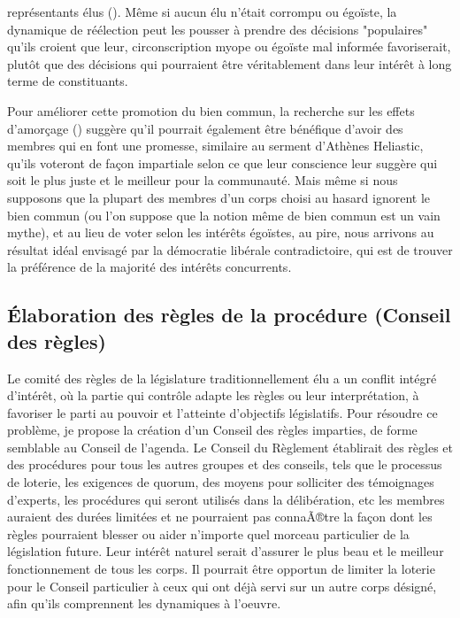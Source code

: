 représentants élus (\cite{fishkin09:_when_peopl_speak}). Même si aucun élu n'était corrompu
ou égoïste, la dynamique de réélection peut les pousser à prendre des
décisions "populaires" qu'ils croient que leur, circonscription myope ou
égoïste mal informée favoriserait, plutôt que des décisions qui
pourraient être véritablement dans leur intérêt à long terme de
constituants.\par
Pour améliorer cette promotion du bien commun, la recherche sur les
effets d'amorçage (\cite{aquino09:_testin_social_cognit_model_moral_behav}) suggère qu'il pourrait également être
bénéfique d'avoir des membres qui en font une promesse, similaire au
serment d'Athènes Heliastic, qu'ils voteront de façon impartiale selon
ce que leur conscience leur suggère qui soit le plus juste et le
meilleur pour la communauté. Mais même si nous supposons que la
plupart des membres d'un corps choisi au hasard ignorent le bien
commun (ou l'on suppose que la notion même de bien commun est un vain
mythe), et au lieu de voter selon les intérêts égoïstes, au pire, nous
arrivons au résultat idéal envisagé par la démocratie libérale
contradictoire, qui est de trouver la préférence de la majorité des
intérêts concurrents.\par
\subsection{\'Elaboration des règles de la procédure (Conseil des règles)}
Le comité des règles de la législature traditionnellement élu a un
conflit intégré d'intérêt, où la partie qui contrôle adapte les règles
ou leur interprétation, à favoriser le parti au pouvoir et l'atteinte
d'objectifs législatifs. Pour résoudre ce problème, je propose la
création d'un Conseil des règles imparties, de forme semblable au
Conseil de l'agenda. Le Conseil du Règlement établirait des
règles et des procédures pour tous les autres groupes et des conseils,
tels que le processus de loterie, les exigences de quorum, des moyens
pour solliciter des témoignages d'experts, les procédures qui seront
utilisés dans la délibération, etc les membres auraient des durées
limitées et ne pourraient pas connaÃ®tre la façon dont les règles
pourraient blesser ou aider n'importe quel morceau particulier de la
législation future. Leur intérêt naturel serait d'assurer le plus
beau et le meilleur fonctionnement de tous les corps. Il pourrait
être opportun de limiter la loterie pour le Conseil particulier à ceux
qui ont déjà servi sur un autre corps désigné, afin qu'ils
comprennent les dynamiques à l'oeuvre. \par
